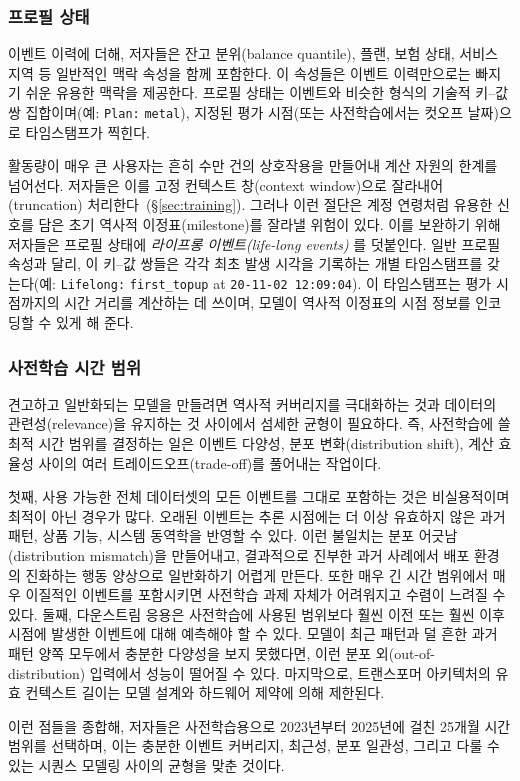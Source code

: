 \subsubsection{프로필 상태}
이벤트 이력에 더해, 저자들은 잔고 분위(balance quantile), 플랜, 보험 상태, 서비스 지역 등 일반적인 맥락 속성을 함께 포함한다.
이 속성들은 이벤트 이력만으로는 빠지기 쉬운 유용한 맥락을 제공한다.
프로필 상태는 이벤트와 비슷한 형식의 기술적 키--값 쌍 집합이며(예: \texttt{Plan:} \texttt{metal}), 지정된 평가 시점(또는 사전학습에서는 컷오프 날짜)으로 타임스탬프가 찍힌다.

활동량이 매우 큰 사용자는 흔히 수만 건의 상호작용을 만들어내 계산 자원의 한계를 넘어선다. 저자들은 이를 고정 컨텍스트 창(context window)으로 잘라내어(truncation) 처리한다~(\S\ref{sec:training}).
그러나 이런 절단은 계정 연령처럼 유용한 신호를 담은 초기 역사적 이정표(milestone)를 잘라낼 위험이 있다.
이를 보완하기 위해 저자들은 프로필 상태에 \emph{라이프롱 이벤트(life-long events)} 를 덧붙인다. 일반 프로필 속성과 달리, 이 키--값 쌍들은 각각 최초 발생 시각을 기록하는 개별 타임스탬프를 갖는다(예: \texttt{Lifelong:} \texttt{first\_topup} at \texttt{20-11-02 12:09:04}).
이 타임스탬프는 평가 시점까지의 시간 거리를 계산하는 데 쓰이며, 모델이 역사적 이정표의 시점 정보를 인코딩할 수 있게 해 준다.

\subsubsection{사전학습 시간 범위}
견고하고 일반화되는 모델을 만들려면 역사적 커버리지를 극대화하는 것과 데이터의 관련성(relevance)을 유지하는 것 사이에서 섬세한 균형이 필요하다.
즉, 사전학습에 쓸 최적 시간 범위를 결정하는 일은 이벤트 다양성, 분포 변화(distribution shift), 계산 효율성 사이의 여러 트레이드오프(trade-off)를 풀어내는 작업이다.

첫째, 사용 가능한 전체 데이터셋의 모든 이벤트를 그대로 포함하는 것은 비실용적이며 최적이 아닌 경우가 많다.
오래된 이벤트는 추론 시점에는 더 이상 유효하지 않은 과거 패턴, 상품 기능, 시스템 동역학을 반영할 수 있다.
이런 불일치는 분포 어긋남(distribution mismatch)을 만들어내고, 결과적으로 진부한 과거 사례에서 배포 환경의 진화하는 행동 양상으로 일반화하기 어렵게 만든다.
또한 매우 긴 시간 범위에서 매우 이질적인 이벤트를 포함시키면 사전학습 과제 자체가 어려워지고 수렴이 느려질 수 있다.
둘째, 다운스트림 응용은 사전학습에 사용된 범위보다 훨씬 이전 또는 훨씬 이후 시점에 발생한 이벤트에 대해 예측해야 할 수 있다.
모델이 최근 패턴과 덜 흔한 과거 패턴 양쪽 모두에서 충분한 다양성을 보지 못했다면, 이런 분포 외(out-of-distribution) 입력에서 성능이 떨어질 수 있다.
마지막으로, 트랜스포머 아키텍처의 유효 컨텍스트 길이는 모델 설계와 하드웨어 제약에 의해 제한된다.

이런 점들을 종합해, 저자들은 사전학습용으로 2023년부터 2025년에 걸친 25개월 시간 범위를 선택하며, 이는 충분한 이벤트 커버리지, 최근성, 분포 일관성, 그리고 다룰 수 있는 시퀀스 모델링 사이의 균형을 맞춘 것이다.
